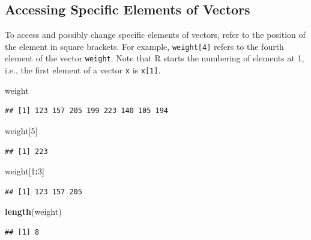 \documentclass[
]{krantz}
\newenvironment{Shaded}{\begin{snugshade}}{\end{snugshade}}
\newcommand{\DecValTok}[1]{\textcolor[rgb]{0.00,0.00,0.81}{#1}}
\newcommand{\KeywordTok}[1]{\textcolor[rgb]{0.13,0.29,0.53}{\textbf{#1}}}
\newcommand{\NormalTok}[1]{#1}
\newcommand{\OperatorTok}[1]{\textcolor[rgb]{0.81,0.36,0.00}{\textbf{#1}}}
\begin{document}
\hypertarget{accessing-specific-elements-of-vectors}{%
\subsection{Accessing Specific Elements of Vectors}\label{accessing-specific-elements-of-vectors}}

To access and possibly change specific elements of vectors, refer to the position of the element in square brackets. For example, \texttt{weight{[}4{]}} refers to the fourth element of the vector \texttt{weight}. Note that R starts the numbering of elements at 1, i.e., the first element of a vector \texttt{x} is \texttt{x{[}1{]}}.

\begin{Shaded}
\begin{Highlighting}[]
\NormalTok{weight}
\end{Highlighting}
\end{Shaded}

\begin{verbatim}
## [1] 123 157 205 199 223 140 105 194
\end{verbatim}

\begin{Shaded}
\begin{Highlighting}[]
\NormalTok{weight[}\DecValTok{5}\NormalTok{]}
\end{Highlighting}
\end{Shaded}

\begin{verbatim}
## [1] 223
\end{verbatim}

\begin{Shaded}
\begin{Highlighting}[]
\NormalTok{weight[}\DecValTok{1}\OperatorTok{:}\DecValTok{3}\NormalTok{]}
\end{Highlighting}
\end{Shaded}

\begin{verbatim}
## [1] 123 157 205
\end{verbatim}

\begin{Shaded}
\begin{Highlighting}[]
\KeywordTok{length}\NormalTok{(weight)}
\end{Highlighting}
\end{Shaded}

\begin{verbatim}
## [1] 8
\end{verbatim}
\end{document}
